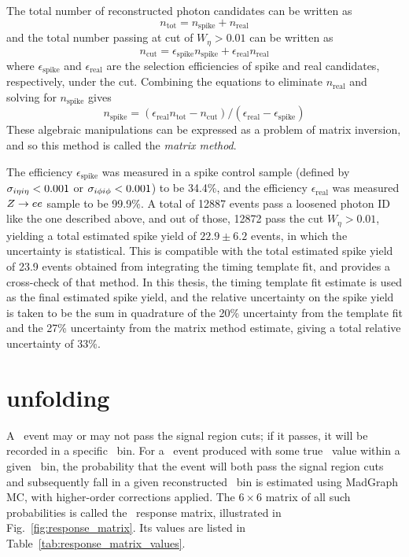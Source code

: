 The total number of reconstructed photon candidates can be written as
\begin{equation}
n_\mathrm{tot} = n_\mathrm{spike} + n_\mathrm{real}
\end{equation}
and the total number passing at cut of $W_{\eta} > 0.01$ can be written as
\begin{equation}
n_\mathrm{cut} = \epsilon_\mathrm{spike} n_\mathrm{spike} + \epsilon_\mathrm{real} n_\mathrm{real}
\end{equation}
where $\epsilon_\mathrm{spike}$ and $\epsilon_\mathrm{real}$ are the selection efficiencies of spike and real candidates, respectively,
under the cut. Combining the equations to eliminate $n_\mathrm{real}$ and solving for $n_\mathrm{spike}$ gives
\begin{equation}
n_\mathrm{spike} = (\epsilon_\mathrm{real} n_\mathrm{tot} - n_\mathrm{cut}) / (\epsilon_\mathrm{real} - \epsilon_\mathrm{spike})
\end{equation}
These algebraic manipulations can be expressed as a problem of matrix inversion, and so this method is called the \textit{matrix method}.

The efficiency $\epsilon_\mathrm{spike}$ was measured in a spike control sample (defined by $\sigma_{i\eta i\eta} < 0.001$ or $\sigma_{i\phi i\phi} < 0.001$) to be 34.4\%,
and the efficiency $\epsilon_\mathrm{real}$ was measured $Z\rightarrow ee$ sample to be 99.9\%.
A total of 12887 events pass a loosened photon ID like the one described above, and out of those, 12872 pass the cut $W_{\eta} > 0.01$, yielding
a total estimated spike yield of $22.9 \pm 6.2$ events, in which the uncertainty is statistical. This is compatible with the total estimated spike yield of
23.9 events obtained from integrating the timing template fit, and provides a cross-check of that method.
In this thesis, the timing template fit
estimate is used as the final estimated spike yield, and the relative uncertainty on the spike yield is taken to be the sum in quadrature of the
20\% uncertainty from the template fit and the 27\% uncertainty from the matrix method estimate, giving a total relative uncertainty of 33\%.

\section{\texorpdfstring{\zinvg}{Z plus gamma} unfolding}
A \zinvg\ event may or may not pass the signal region cuts; if it passes, it will be recorded in a specific \ETgamma\ bin.
For a \zinvg\ event produced with some true \pTgamma\ value within a given \pTgamma\ bin, the probability that
the event will both pass the signal region cuts and subsequently fall in a given reconstructed \ETgamma\ bin is estimated
using MadGraph MC, with higher-order corrections applied.
The $6{\times}6$ matrix of all such probabilities is called the \zinvg\ response matrix, illustrated in Fig.~\ref{fig:response_matrix}.
Its values are listed in Table~\ref{tab:response_matrix_values}.

